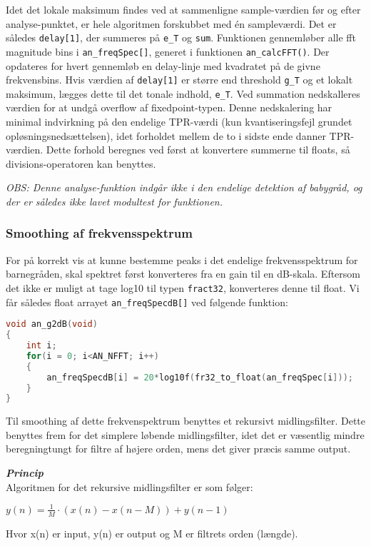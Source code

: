 Idet det lokale maksimum findes ved at sammenligne sample-værdien før og efter analyse-punktet, er hele algoritmen forskubbet med én sampleværdi. Det er således \verb+delay[1]+, der summeres på \verb+e_T+ og \verb+sum+. Funktionen gennemløber alle fft magnitude bins i \verb+an_freqSpec[]+, generet i funktionen \verb+an_calcFFT()+. Der opdateres for hvert gennemløb en delay-linje med kvadratet på de givne frekvensbins. Hvis værdien af \verb+delay[1]+ er større end threshold \verb+g_T+ og et lokalt maksimum, lægges dette til det tonale indhold, \verb+e_T+. Ved summation nedskalleres værdien for at undgå overflow af fixedpoint-typen. Denne nedskalering har minimal indvirkning på den endelige TPR-værdi (kun kvantiseringsfejl grundet opløsningsnedsættelsen), idet forholdet mellem de to i sidste ende danner TPR-værdien. Dette forhold beregnes ved først at konvertere summerne til floats, så divisions-operatoren kan benyttes.

\textit{OBS: Denne analyse-funktion indgår ikke i den endelige detektion af babygråd, og der er således ikke lavet modultest for funktionen.}

\subsubsection{Smoothing af frekvensspektrum}
For på korrekt vis at kunne bestemme peaks i det endelige frekvensspektrum for barnegråden, skal spektret først konverteres fra en gain til en dB-skala. Eftersom det ikke er muligt at tage log10 til typen \verb+fract32+, konverteres denne til float. Vi får således float arrayet \verb+an_freqSpecdB[]+ ved følgende funktion:
\begin{lstlisting}[language=C,numbers=none]
void an_g2dB(void)
{
    int i;
    for(i = 0; i<AN_NFFT; i++)
    {
        an_freqSpecdB[i] = 20*log10f(fr32_to_float(an_freqSpec[i]));
    }
}\end{lstlisting}

Til smoothing af dette frekvenspektrum benyttes et rekursivt midlingsfilter. Dette benyttes frem for det simplere løbende midlingsfilter, idet det er væsentlig mindre beregningtungt for filtre af højere orden, mens det giver præcis samme output.

\textbf{\textit{Princip}} \\
Algoritmen for det rekursive midlingsfilter er som følger:
\begin{center}
$y\left( n \right) =\frac { 1 }{ M } \cdot \left( x\left( n \right) -x\left( n-M \right)  \right) +y\left( n-1 \right) $
\end{center}
Hvor x(n) er input, y(n) er output og M er filtrets orden (længde).

